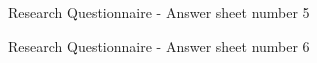 \documentclass[a4paper]{article}
\begin{document}
\begin{appendices}
\begin{figure}[h!]
		\caption{Research Questionnaire - Answer sheet number 5}
	\end{figure}
	\newpage
	\begin{figure}[h!]
		\caption{Research Questionnaire - Answer sheet number 6}
	\end{figure}
	\newpage
	\begin{figure}[h!]

\end{figure}
\end{appendices}
\end{document}
